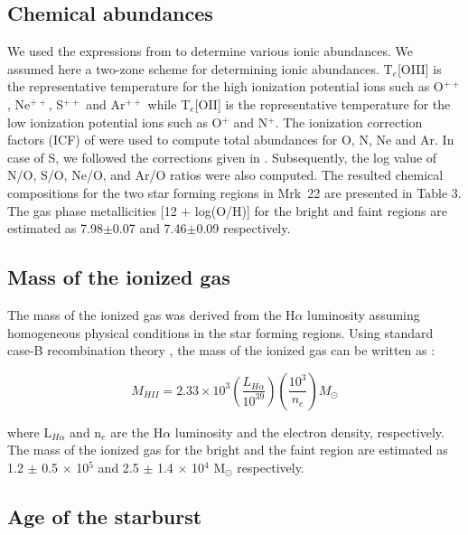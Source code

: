 \documentclass[useAMS,usenatbib]{mn2e}
\begin{document}
\subsection{Chemical abundances}

We used the expressions from \citet{2006A&A...448..955I} to determine various ionic abundances. We assumed here a two-zone scheme for determining ionic abundances. T$_{e}$[O{\small{III}}] is the representative temperature for the high ionization potential ions such as O$^{++}$, Ne$^{++}$, S$^{++}$ and Ar$^{++}$ while T$_{e}$[O{\small{II}}] is the representative temperature for the low ionization potential ions such as O$^{+}$ and N$^{+}$. The ionization correction factors (ICF) of \citet{2006A&A...448..955I} were used to compute total abundances for O, N, Ne and Ar. In case of S, we followed the corrections given in \citet{1969BOTT....5....3P}. Subsequently, the log value of N/O, S/O, Ne/O, and Ar/O ratios were also computed. The resulted chemical compositions for the two star forming regions in Mrk~22 are presented in Table 3. The gas phase metallicities [12 + log(O/H)] for the bright and faint regions are estimated as 7.98$\pm$0.07 and 7.46$\pm$0.09 respectively. 

\subsection{Mass of the ionized gas}

The mass of the ionized gas was derived from the H${\alpha}$ luminosity assuming homogeneous physical conditions in the star forming regions. Using standard case-B recombination theory \citep{1974agn..book.....O}, the mass of the ionized gas can be written as \citep{1994A&AS..105..341G,1996A&AS..120..463M}:

\begin{equation} 
M_{HII} = 2.33 \times 10^{3} (\frac{L_{H\alpha}}{10^{39}})(\frac{10^{3}}{n_{e}}) M_{\odot}
\end{equation}

\noindent where L$_{H\alpha}$ and n$_{e}$ are the H${\alpha}$ luminosity and the electron density, respectively. The mass of the ionized gas for the bright and the faint region are estimated as 1.2 $\pm$ 0.5 $\times$ 10$^{5}$ and 2.5 $\pm$ 1.4 $\times$ 10$^{4}$ M$_{\odot}$ respectively.
 
\subsection{Age of the starburst}\label{sec:3.5}
\end{document}
